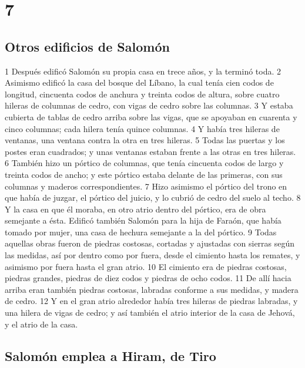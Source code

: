 \chapter{7}

\section*{Otros edificios de Salomón}

1 Después edificó Salomón su propia casa en trece años, y la terminó toda.
2 Asimismo edificó la casa del bosque del Líbano, la cual tenía cien codos   de longitud, cincuenta codos de anchura y treinta codos de altura, sobre cuatro hileras de columnas de cedro, con vigas de cedro sobre las columnas.
3 Y estaba cubierta de tablas de cedro arriba sobre las vigas, que se apoyaban en cuarenta y cinco columnas; cada hilera tenía quince columnas.
4 Y había tres hileras de ventanas, una ventana contra la otra en tres hileras.
5 Todas las puertas y los postes eran cuadrados; y unas ventanas estaban frente a las otras en tres hileras.
6 También hizo un pórtico de columnas, que tenía cincuenta codos   de largo y treinta codos de ancho; y este pórtico estaba delante de las primeras, con sus columnas y maderos correspondientes.
7 Hizo asimismo el pórtico del trono en que había de juzgar, el pórtico del juicio, y lo cubrió de cedro del suelo al techo.
8 Y la casa en que él moraba, en otro atrio dentro del pórtico, era de obra semejante a ésta. Edificó también Salomón para la hija de Faraón, que había tomado por mujer, una casa de hechura semejante a la del pórtico.
9 Todas aquellas obras fueron de piedras costosas, cortadas y ajustadas con sierras según las medidas, así por dentro como por fuera, desde el cimiento hasta los remates, y asimismo por fuera hasta el gran atrio.
10 El cimiento era de piedras costosas, piedras grandes, piedras de diez codos   y piedras de ocho codos.
11 De allí hacia arriba eran también piedras costosas, labradas conforme a sus medidas, y madera de cedro.
12 Y en el gran atrio alrededor había tres hileras de piedras labradas, y una hilera de vigas de cedro; y así también el atrio interior de la casa de Jehová, y el atrio de la casa.

\section*{Salomón emplea a Hiram, de Tiro}

